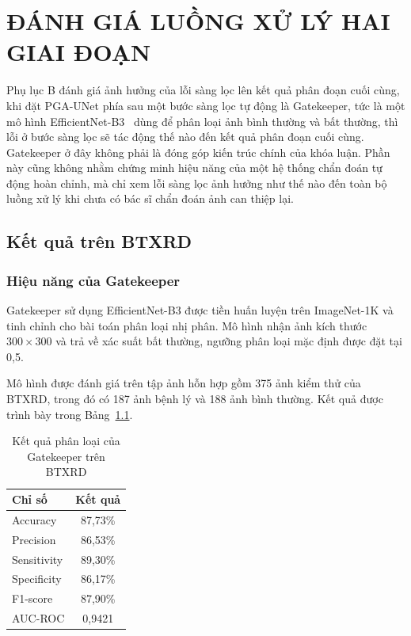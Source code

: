 \chapter{ĐÁNH GIÁ LUỒNG XỬ LÝ HAI GIAI ĐOẠN}
\label{AppendixB}

Phụ lục B đánh giá ảnh hưởng của lỗi sàng lọc lên kết quả phân đoạn cuối cùng, khi đặt PGA-UNet phía sau một bước sàng lọc tự động là Gatekeeper, tức là một mô hình EfficientNet-B3~\cite{tan2019efficientnet} dùng để phân loại ảnh bình thường và bất thường, thì lỗi ở bước sàng lọc sẽ tác động thế nào đến kết quả phân đoạn cuối cùng. Gatekeeper ở đây không phải là đóng góp kiến trúc chính của khóa luận. Phần này cũng không nhằm chứng minh hiệu năng của một hệ thống chẩn đoán tự động hoàn chỉnh, mà chỉ xem lỗi sàng lọc ảnh hưởng như thế nào đến toàn bộ luồng xử lý khi chưa có bác sĩ chẩn đoán ảnh can thiệp lại.
\section{Kết quả trên BTXRD}
\label{subsec:product_overview_btxrd}

\subsection{Hiệu năng của Gatekeeper}
\label{sec:danh_gia_phan_lop}

Gatekeeper sử dụng EfficientNet-B3 được tiền huấn luyện trên ImageNet-1K và tinh chỉnh cho bài toán phân loại nhị phân. Mô hình nhận ảnh kích thước $300\times300$ và trả về xác suất bất thường, ngưỡng phân loại mặc định được đặt tại 0,5.

Mô hình được đánh giá trên tập ảnh hỗn hợp gồm 375 ảnh kiểm thử của BTXRD, trong đó có 187 ảnh bệnh lý và 188 ảnh bình thường. Kết quả được trình bày trong Bảng~\ref{tab:classification_results}.

\begin{table}[htbp]
    \centering
    \caption{Kết quả phân loại của Gatekeeper trên BTXRD}
    \label{tab:classification_results}
    \renewcommand{\arraystretch}{1.3}
    \begin{tabular}{|p{7.5cm}|c|}
        \hline
        \textbf{Chỉ số} & \textbf{Kết quả} \\
        \hline
        Accuracy & 87,73\% \\
        \hline
        Precision & 86,53\% \\
        \hline
        Sensitivity & 89,30\% \\
        \hline
        Specificity & 86,17\% \\
        \hline
        F1-score & 87,90\% \\
        \hline
        AUC-ROC & 0,9421 \\
        \hline
    \end{tabular}
\end{table}

